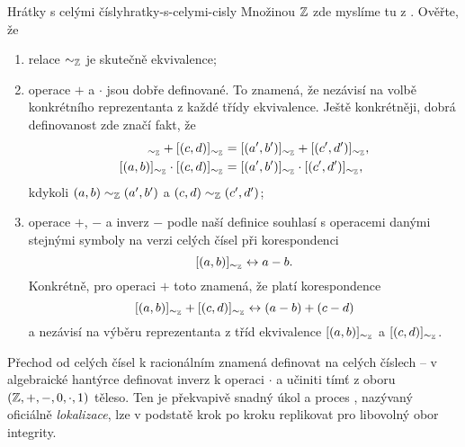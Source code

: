 \begin{exercise}{Hrátky s celými čísly}{hratky-s-celymi-cisly}
 Množinou $\mathbb{Z}$ zde myslíme tu z . Ověřte, že
 \begin{enumerate}
  \item relace $ \sim _{\mathbb{Z}}$ je skutečně ekvivalence;
  \item operace $+$ a $ \cdot $ jsou dobře definované. To znamená, že nezávisí
   na volbě konkrétního reprezentanta z každé třídy ekvivalence. Ještě
   konkrétněji, dobrá definovanost zde značí fakt, že
   \begin{align*}
    [(a,b)]_{ \sim_{\Z}} + [(c,d)]_{ \sim _{\Z}} &= [(a',b')]_{ \sim _{\Z}} +
    [(c',d')]_{ \sim _{\Z}},\\
    [(a,b)]_{ \sim_{\Z}} \cdot [(c,d)]_{ \sim _{\Z}} &= [(a',b')]_{ \sim _{\Z}}
    \cdot [(c',d')]_{ \sim _{\Z}},
   \end{align*}
   kdykoli $(a,b) \sim _{\mathbb{Z}} (a',b')$ a $(c,d) \sim _{\mathbb{Z}} (c',d')$;
  \item operace $+$, $-$ a inverz $-$ podle naší definice souhlasí s operacemi
   danými stejnými symboly na  verzi celých čísel při korespondenci
   \[
    [(a,b)]_{ \sim_{\mathbb{Z}}} \leftrightarrow a - b.
   \]
   Konkrétně, pro operaci $+$ toto znamená, že platí korespondence
   \[
    [(a,b)]_{ \sim_{\mathbb{Z}}} + [(c,d)]_{ \sim _{\mathbb{Z}}} \leftrightarrow (a - b) + (c -
    d)
   \]
   a nezávisí na výběru reprezentanta z tříd ekvivalence $[(a,b)]_{ \sim _{\mathbb{Z}}}$
   a $[(c,d)]_{ \sim_{\mathbb{Z}}}$.
 \end{enumerate}
\end{exercise}

Přechod od celých čísel k racionálním znamená definovat na celých číslech
 -- v algebraické hantýrce definovat inverz k operaci $ \cdot $ a
učiniti tímť z oboru $(\mathbb{Z},+,-,0, \cdot ,1)$ těleso. Ten je překvapivě snadný
úkol a proces , nazývaný oficiálně \emph{lokalizace}, lze v
podstatě krok po kroku replikovat pro libovolný obor integrity.

